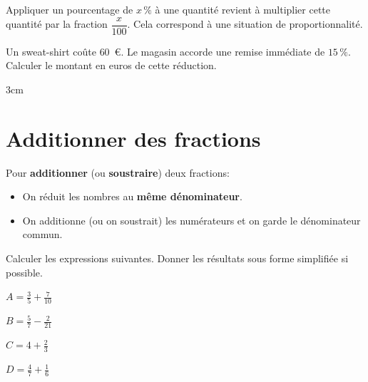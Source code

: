 \documentclass[a4paper]{book}
\begin{document}
    
    \begin{propriete}
        Appliquer un pourcentage de $x\,\%$ à une quantité revient à multiplier cette quantité par la fraction $\dfrac{x}{100}$. 
        Cela correspond à une situation de proportionnalité.
    \end{propriete}

\newpage


    \begin{exemple}
        Un sweat-shirt coûte $60$~\euro. Le magasin accorde une remise immédiate de $15\,\%$. Calculer le montant en euros de cette réduction.
        \begin{ZoneReponse}{3cm}
        \end{ZoneReponse}
    \end{exemple}
    
    
\section{Additionner des fractions}
    
    \begin{propriete}
        Pour \textbf{additionner} (ou \textbf{soustraire}) deux fractions:
        \begin{itemize}
            \item On réduit les nombres au \textbf{même dénominateur}.
            \item On additionne (ou on soustrait) les numérateurs et on garde le dénominateur commun.
        \end{itemize}
    \end{propriete}
    
    \begin{exemple}
        Calculer les expressions suivantes. Donner les résultats sous forme simplifiée si possible.\medskip

        \begin{minipage}{0.24\linewidth}
            $A = \frac{3}{5} + \frac{7}{10}$

            \vspace{4cm}
        \end{minipage}
        \hfill\vline \hfill
        \begin{minipage}{0.24\linewidth}
            $B = \frac{5}{7} - \frac{2}{21}$

            \vspace{4cm}
        \end{minipage}
        \hfill\vline \hfill
        \begin{minipage}{0.24\linewidth}
            $C = 4 + \frac{2}{3}$       

            \vspace{4cm}
        \end{minipage}
        \hfill\vline \hfill
        \begin{minipage}{0.24\linewidth}
            $D = \frac{4}{7}+\frac{1}{6}$

            \vspace{4cm}
        \end{minipage}
    \end{exemple}
    
\end{document}

